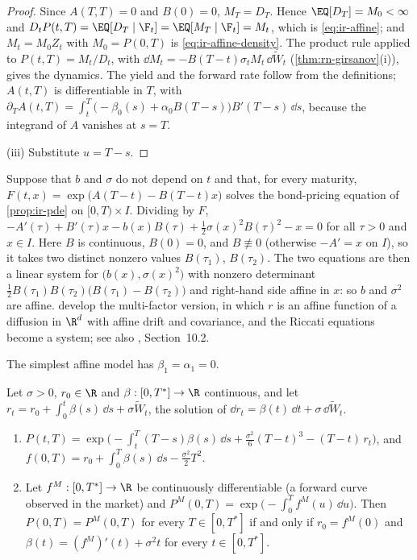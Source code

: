 \begin{proof}
Since $A(T,T)=0$ and $B(0)=0$, $M_T=D_T$. Hence $\EQ[D_T]=M_0<\infty$ and
$D_tP(t,T)=\EQ[D_T\mid\F_t]=\EQ[M_T\mid\F_t]=M_t$, which is \eqref{eq:ir-affine}; and
$M_t=M_0Z_t$ with $M_0=P(0,T)$ is \eqref{eq:ir-affine-density}. The product rule applied to
$P(t,T)=M_t/D_t$, with $\dd M_t=-B(T-t)\sigma_tM_t\,\dd\widetilde W_t$ (\cref{thm:rn-girsanov}(i)),
gives the dynamics. The yield and the forward rate follow from the definitions; $A(t,T)$ is
differentiable in $T$, with $\partial_TA(t,T)=\int_t^T\big(-\beta_0(s)+\alpha_0B(T-s)\big)B'(T-s)\,\dd s$,
because the integrand of $A$ vanishes at $s=T$.

(iii) Substitute $u=T-s$.
\end{proof}

\begin{remark}\label{rem:ir-duffie-kan}
Suppose that $b$ and $\sigma$ do not depend on $t$ and that, for every maturity,
$F(t,x)=\exp\big(A(T-t)-B(T-t)x\big)$ solves the bond-pricing equation of \cref{prop:ir-pde} on
$[0,T)\times I$. Dividing by $F$, $-A'(\tau)+B'(\tau)x-b(x)B(\tau)+\frac12\sigma(x)^2B(\tau)^2-x=0$ for
all $\tau>0$ and $x\in I$. Here $B$ is continuous, $B(0)=0$, and $B\not\equiv0$ (otherwise
$-A'=x$ on $I$), so it takes two distinct nonzero values $B(\tau_1)$, $B(\tau_2)$. The two
equations are then a linear system for $\big(b(x),\sigma(x)^2\big)$ with nonzero determinant
$\frac12B(\tau_1)B(\tau_2)\big(B(\tau_1)-B(\tau_2)\big)$ and right-hand side affine in $x$: so $b$
and $\sigma^2$ are affine.  develop the multi-factor version, in which
$r$ is an affine function of a diffusion in $\R^d$ with affine drift and covariance, and the
Riccati equations become a system; see also \textcite{shreve2}, Section~10.2.
\end{remark}

The simplest affine model has $\beta_1=\alpha_1=0$.

\begin{proposition}\label{prop:ir-ho-lee}
Let $\sigma>0$, $r_0\in\R$ and $\beta:[0,T^*]\to\R$ continuous, and let
$r_t=r_0+\int_0^t\beta(s)\,\dd s+\sigma\widetilde W_t$, the solution of
$\dd r_t=\beta(t)\,\dd t+\sigma\,\dd\widetilde W_t$.
\begin{enumerate}[label=(\roman*)]
  \item $P(t,T)=\exp\big(-\int_t^T(T-s)\beta(s)\,\dd s+\frac{\sigma^2}6(T-t)^3-(T-t)\,r_t\big)$, and
    $f(0,T)=r_0+\int_0^T\beta(s)\,\dd s-\frac{\sigma^2}2T^2$.
  \item Let $f^M:[0,T^*]\to\R$ be continuously differentiable (a forward curve observed in the
    market) and $P^M(0,T)=\exp\big(-\int_0^Tf^M(u)\,\dd u\big)$. Then $P(0,T)=P^M(0,T)$ for every
    $T\in[0,T^*]$ if and only if $r_0=f^M(0)$ and $\beta(t)=(f^M)'(t)+\sigma^2t$ for every
    $t\in[0,T^*]$.
\end{enumerate}
\end{proposition}

